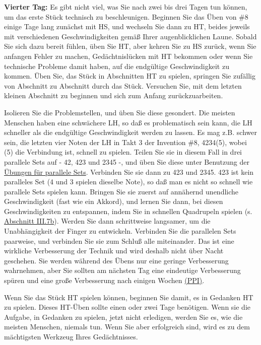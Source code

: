 \textbf{Vierter Tag:} Es gibt nicht viel, was Sie nach zwei bis drei Tagen tun können, um das erste Stück technisch zu beschleunigen.
Beginnen Sie das Üben von \#8 einige Tage lang zunächst mit HS, und wechseln Sie dann zu HT, beides jeweils mit verschiedenen Geschwindigkeiten gemäß Ihrer augenblicklichen Laune.
Sobald Sie sich dazu bereit fühlen, üben Sie HT, aber kehren Sie zu HS zurück, wenn Sie anfangen Fehler zu machen, Gedächtnislücken mit HT bekommen oder wenn Sie technische Probleme damit haben, auf die endgültige Geschwindigkeit zu kommen.
Üben Sie, das Stück in Abschnitten HT zu spielen, springen Sie zufällig von Abschnitt zu Abschnitt durch das Stück.
Versuchen Sie, mit dem letzten kleinen Abschnitt zu beginnen und sich zum Anfang zurückzuarbeiten.

Isolieren Sie die Problemstellen, und üben Sie diese gesondert.
Die meisten Menschen haben eine schwächere LH, so daß es problematisch sein kann, die LH schneller als die endgültige Geschwindigkeit werden zu lassen.
Es mag z.B. schwer sein, die letzten vier Noten der LH in Takt 3 der Invention \#8, 4234(5), wobei (5) die Verbindung ist, schnell zu spielen.
Teilen Sie sie in diesem Fall in drei parallele Sets auf - 42, 423 und 2345 -, und üben Sie diese unter Benutzung der \hyperlink{c1iii7b}{Übungen für parallele Sets}.
Verbinden Sie sie dann zu 423 und 2345.
423 ist kein paralleles Set (4 und 3 spielen dieselbe Note), so daß man es nicht so schnell wie parallele Sets spielen kann.
Bringen Sie sie zuerst auf annähernd unendliche Geschwindigkeit (fast wie ein Akkord), und lernen Sie dann, bei diesen Geschwindigkeiten zu entspannen, indem Sie in schnellen Quadrupeln spielen (s. \hyperlink{c1iii7b1}{Abschnitt III.7b}).
Werden Sie dann schrittweise langsamer, um die Unabhängigkeit der Finger zu entwickeln.
Verbinden Sie die parallelen Sets paarweise, und verbinden Sie sie zum Schluß alle miteinander.
Das ist eine wirkliche Verbesserung der Technik und wird deshalb nicht über Nacht geschehen.
Sie werden während des Übens nur eine geringe Verbesserung wahrnehmen, aber Sie sollten am nächsten Tag eine eindeutige Verbesserung spüren und eine große Verbesserung nach einigen Wochen \hyperlink{c1ii15}{(PPI)}.

Wenn Sie das Stück HT spielen können, beginnen Sie damit, es in Gedanken HT zu spielen.
Dieses HT-Üben sollte einen oder zwei Tage benötigen.
Wenn sie die Aufgabe, in Gedanken zu spielen, jetzt nicht erledigen, werden Sie es, wie die meisten Menschen, niemals tun.
Wenn Sie aber erfolgreich sind, wird es zu dem mächtigsten Werkzeug Ihres Gedächtnisses.


